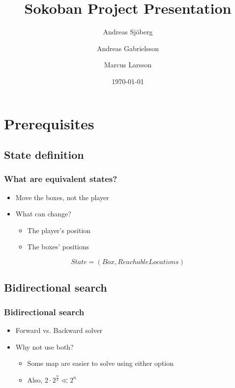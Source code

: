 \documentclass[]{beamer}
\title{Sokoban Project Presentation}
\author{Andreas Sjöberg \and Andreas Gabrielsson \and Marcus Larsson}
\institute{The Predicates \\ KTH}
\date{\today}
\begin{document}
\begin{frame}
  \titlepage
\end{frame}

\section[Outline]{}

\begin{frame}
  \tableofcontents
\end{frame}

\section{Prerequisites}

\subsection{State definition}
\begin{frame}
	\frametitle{What are equivalent states?}
	\begin{itemize}
		\item{Move the boxes, not the player}
		\item{What can change?
			\pause
			\begin{itemize}
				\item{The player's position}
				\item{The boxes' positions}
			\end{itemize}
		}
	\end{itemize}
	\pause
	$$State = (Box, ReachableLocations) $$ 
\end{frame}

\subsection{Bidirectional search}
\begin{frame}
	\frametitle{Bidirectional search}
	\begin{itemize}
		\item{Forward vs. Backward solver}
		\pause
		\item{Why not use both?
			\begin{itemize}
				\item{Some map are easier to solve using either option}
				\item{Also, $2 \cdot 2^\frac{n}{2} \ll 2^n$}
			\end{itemize}
		}
	\end{itemize}
\end{frame}
\end{document}

